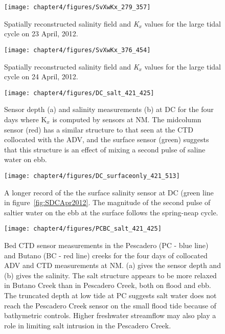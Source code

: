 \begin{figure}
	\texttt{[image: chapter4/figures/SvXwKx\_279\_357]} 
\caption{Spatially reconstructed salinity field and \emph{K$_x$} values for the large tidal cycle on 23 April, 2012. } \label{fig:Kx423}
\end{figure}



\begin{figure}
	\texttt{[image: chapter4/figures/SvXwKx\_376\_454]} 
\caption{Spatially reconstructed salinity field and \emph{K$_x$} values for the large tidal cycle on 24 April, 2012.} \label{fig:Kx424}
\end{figure}



\begin{figure}
	\texttt{[image: chapter4/figures/DC\_salt\_421\_425]}
	\caption{Sensor depth (a) and salinity measurements (b) at DC for the four days where K$_x$ is computed by sensors at NM. The midcolumn sensor (red) has a similar structure to that seen at the CTD collocated with the ADV, and the surface sensor (green) suggests that this structure is an effect of mixing a second pulse of saline water on ebb.} \label{fig:SDCApr2012} \label{fig:DC_salt_421_425}
\end{figure}


\begin{figure}
	\texttt{[image: chapter4/figures/DC\_surfaceonly\_421\_513]}
	\caption{A longer record of the the surface salinity sensor at DC (green line in figure~\ref{fig:SDCApr2012}. The magnitude of the second pulse of saltier water on the ebb at the surface follows the spring-neap cycle.} \label{fig:SsurfLT}
\end{figure}


\begin{figure}
	\texttt{[image: chapter4/figures/PCBC\_salt\_421\_425]}
	\caption{Bed CTD sensor measurements in the Pescadero (PC - blue line) and Butano (BC  - red line) creeks for the four days of collocated ADV and CTD measurements at NM. (a) gives the sensor depth and (b) gives the salinity. The salt structure appears to be more relaxed in Butano Creek than in Pescadero Creek, both on flood and ebb. The truncated depth at low tide at PC suggests salt water does not reach the Pescadero Creek sensor on the small flood tide because of bathymetric controls. Higher freshwater streamflow may also play a role in limiting salt intrusion in the Pescadero Creek.} \label{fig:PCBC421:425}
\end{figure}



